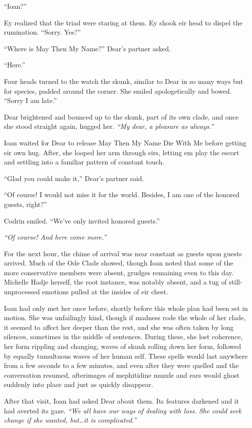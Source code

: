 ``Ioan?''

Ey realized that the triad were staring at them. Ey shook eir head to dispel the rumination. ``Sorry. Yes?''

``Where is May Then My Name?'' Dear's partner asked.

``Here.''

Four heads turned to the watch the skunk, similar to Dear in so many ways but for species, padded around the corner. She smiled apologetically and bowed. ``Sorry I am late.''

Dear brightened and bounced up to the skunk, part of its own clade, and once she stood straight again, hugged her. \emph{``My dear, a pleasure as always.''}

Ioan waited for Dear to release May Then My Name Die With Me before getting eir own hug. After, she looped her arm through eirs, letting em play the escort and settling into a familiar pattern of constant touch.

``Glad you could make it,'' Dear's partner said.

``Of course! I would not miss it for the world. Besides, I am one of the honored guests, right?''

Codrin smiled. ``We've only invited honored guests.''

\emph{``Of course! And here come more.''}

For the next hour, the chime of arrival was near constant as guests upon guests arrived. Much of the Ode Clade showed, though Ioan noted that some of the more conservative members were absent, grudges remaining even to this day. Michelle Hadje herself, the root instance, was notably absent, and a tug of still-unprocessed emotions pulled at the insides of eir chest.

Ioan had only met her once before, shortly before this whole plan had been set in motion. She was unfailingly kind, though if madness rode the whole of her clade, it seemed to affect her deeper than the rest, and she was often taken by long silences, sometimes in the middle of sentences. During these, she lost coherence, her form rippling and changing, waves of skunk rolling down her form, followed by equally tumultuous waves of her human self. These spells would last anywhere from a few seconds to a few minutes, and even after they were quelled and the conversation resumed, afterimages of mephitidine muzzle and ears would ghost suddenly into place and just as quickly disappear.

After that visit, Ioan had asked Dear about them. Its features darkened and it had averted its gaze. \emph{``We all have our ways of dealing with loss. She could seek change if she wanted, but\ldots it is complicated.''}

